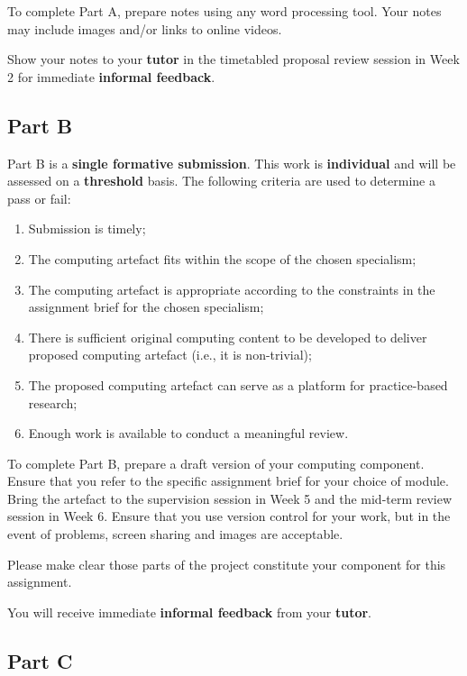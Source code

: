 \documentclass{../../fal_assignment}
\begin{document}
To complete Part A, prepare notes using any word processing tool. Your notes may include images and/or links to online videos.

Show your notes to your \textbf{tutor} in the timetabled proposal review session in Week 2 for immediate \textbf{informal feedback}.

\subsection*{Part B}

Part B is a \textbf{single formative submission}. This work is \textbf{individual} and will be assessed on a \textbf{threshold} basis. The following criteria are used to determine a pass or fail:

\begin{enumerate}[label=(\alph*)]
	\item Submission is timely;
	\item The computing artefact fits within the scope of the chosen specialism;
	\item The computing artefact is appropriate according to the constraints in the assignment brief for the chosen specialism;
	\item There is sufficient original computing content to be developed to deliver proposed computing artefact (i.e., it is non-trivial);
	\item The proposed computing artefact can serve as a platform for practice-based research;
	\item Enough work is available to conduct a meaningful review.
\end{enumerate}

To complete Part B, prepare a draft version of your computing component. Ensure that you refer to the specific assignment brief for your choice of module.
Bring the artefact to the supervision session in Week 5 and the mid-term review session in Week 6. Ensure that you use version control for your work, but in the event of problems, screen sharing and images are acceptable.

Please make clear those parts of the project constitute your component for this assignment.

You will receive immediate \textbf{informal feedback} from your \textbf{tutor}.

\subsection*{Part C}
\end{document}
